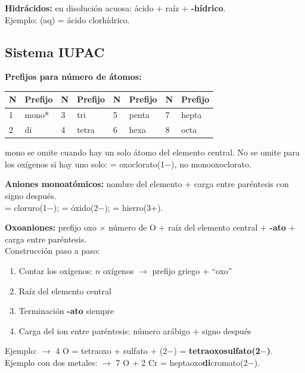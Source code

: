 \textbf{Hidrácidos:} en disolución acuosa: ácido + raíz + \textbf{-hídrico}.\\
Ejemplo: (aq) = ácido clorhídrico.

\vspace{0.5em}

\subsection*{\textcolor{blueunam}{Sistema IUPAC}}

\textbf{Prefijos para número de átomos:}

\renewcommand{\arraystretch}{1.2}
\begin{longtable}{C{1.4cm} C{1.8cm} C{1.4cm} C{1.8cm} C{1.4cm} C{1.8cm} C{1.4cm} C{1.8cm}}
\toprule
\textbf{N} & \textbf{Prefijo} & \textbf{N} & \textbf{Prefijo} & \textbf{N} & \textbf{Prefijo} & \textbf{N} & \textbf{Prefijo} \\
 & mono* & 3 & tri  & 5 & penta & 7 & hepta \\
2 & di    & 4 & tetra& 6 & hexa  & 8 & octa  \\
\bottomrule
\end{longtable}
{\small *mono se omite cuando hay un solo átomo del elemento central. No se omite para los oxígenos si hay uno solo:  = oxoclorato(1$-$), no monooxoclorato.}

\vspace{0.4em}

\textbf{Aniones monoatómicos:} nombre del elemento + carga entre paréntesis con signo después.\\
 = cloruro(1$-$); \quad {} = óxido(2$-$); \quad {} = hierro(3+).

\textbf{Oxoaniones:} prefijo oxo $\times$ número de O + raíz del elemento central + \textbf{-ato} + carga entre paréntesis.\\
Construcción paso a paso:
\begin{enumerate}
  \item Contar los oxígenos: $n$ oxígenos $\to$ prefijo griego + ``oxo''
  \item Raíz del elemento central
  \item Terminación \textbf{-ato} siempre
  \item Carga del ion entre paréntesis: número arábigo + signo después
\end{enumerate}
Ejemplo:  $\to$ 4 O = tetraoxo + sulfato + (2$-$) = \textbf{tetraoxosulfato(2$-$)}.\\
Ejemplo con dos metales:  $\to$ 7 O + 2 Cr = heptaoxo\textbf{di}cromato(2$-$).

